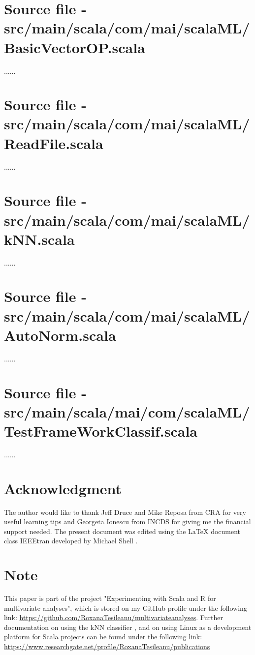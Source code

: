\documentclass[journal]{IEEEtran}
\begin{document}
\appendices
\section{Source file - src/main/scala/com/mai/scalaML/BasicVectorOP.scala}

......

\section{Source file - src/main/scala/com/mai/scalaML/ReadFile.scala}

......

\section{Source file - src/main/scala/com/mai/scalaML/kNN.scala}

......

\section{Source file - src/main/scala/com/mai/scalaML/AutoNorm.scala}

......

\section{Source file - src/main/scala/mai/com/scalaML/TestFrameWorkClassif.scala}

......

 

\section*{Acknowledgment}
The author would like to thank Jeff Druce and Mike Reposa from CRA for very useful learning tips and Georgeta Ionescu from INCDS for giving me the financial support needed. The present document was edited using the LaTeX document class IEEEtran developed by Michael Shell \cite{shell_how_nodate}.  

\section*{Note}
This paper is part of the project "Experimenting with Scala and R for multivariate analyses", which  is stored on my GitHub profile under the following link: \href{https://github.com/RoxanaTesileanu/multivariate_analyses}{https://github.com/RoxanaTesileanu/multivariate\underline{\space}analyses}. Further documentation on using the kNN classifier \cite{tesileanu_introduction_2017}, and on using Linux as a development platform for Scala projects \cite{tesileanu_using_2017} can be found under the following link: \href{https://www.researchgate.net/profile/Roxana_Tesileanu/publications}{https://www.researchgate.net/profile/Roxana\underline{\space}Tesileanu/publications}  


\end{document}

